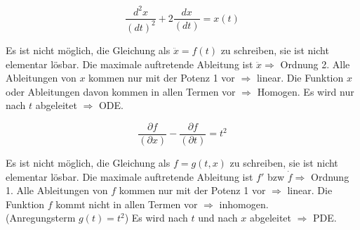 \begin{equation*}
    \frac{d^2x}{\left( d t \right)^{2}} + 2
    \frac{d x}{\left( d t \right)} = x\left( t \right)
\end{equation*}

\begin{outline}
    \1 Es ist nicht möglich, die Gleichung als $\ddot{x}=f(t)$ zu schreiben, sie
    ist nicht elementar lösbar.
    \1 Die maximale auftretende Ableitung ist $\ddot{x}\Rightarrow$ Ordnung 2.
    \1 Alle Ableitungen von $x$ kommen nur mit der Potenz 1 vor $\Rightarrow$ linear.
    \1 Die Funktion $x$ oder Ableitungen davon kommen in allen Termen vor $\Rightarrow$ Homogen.
    \1 Es wird nur nach $t$ abgeleitet $\Rightarrow$ ODE.
\end{outline}

\begin{equation*}
    \frac{\partial f}{\left( \partial x \right)} - 
    \frac{\partial f}{\left( \partial t \right)} = t^{2} 
\end{equation*}

\begin{outline}
    \1 Es ist nicht möglich, die Gleichung als $f=g(t,x)$ zu schreiben, sie
    ist nicht elementar lösbar.
    \1 Die maximale auftretende Ableitung ist $f'$ bzw $\dot{f}\Rightarrow$ Ordnung 1.
    \1 Alle Ableitungen von $f$ kommen nur mit der Potenz 1 vor $\Rightarrow$ linear.
    \1 Die Funktion $f$ kommt nicht in allen Termen vor $\Rightarrow$ inhomogen.\\
       (Anregungsterm $g(t)=t^{2}$)
    \1 Es wird nach $t$ und nach $x$ abgeleitet $\Rightarrow$ PDE.
\end{outline}




